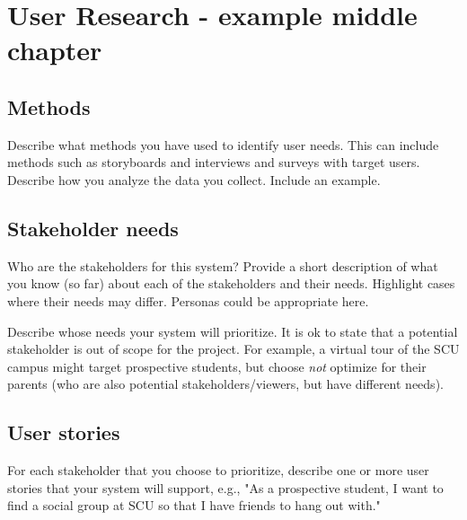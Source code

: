 \chapter{User Research - example middle chapter}

\section{Methods}
Describe what methods you have used to identify user needs. This can include methods such as storyboards and interviews and surveys with target users. Describe how you analyze the data you collect. Include an example. 

\section{Stakeholder needs}
Who are the stakeholders for this system? Provide a short description of what you know (so far) about each of the stakeholders and their needs. Highlight cases where their needs may differ. Personas could be appropriate here.

Describe whose needs your system will prioritize. It is ok to state that a potential stakeholder is out of scope for the project. For example, a virtual tour of the SCU campus might target prospective students, but choose \textit{not} optimize for their parents (who are also potential stakeholders/viewers, but have different needs).

\section{User stories} 
For each stakeholder that you choose to prioritize, describe one or more user stories that your system will support, e.g., "As a prospective student, I want to find a social group at SCU so that I have friends to hang out with."
